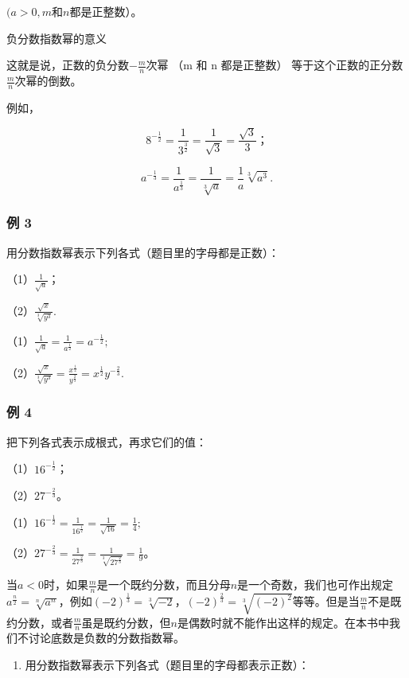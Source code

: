 \((a > 0, m\)和\(n\)都是正整数）。

负分数指数幂的意义

这就是说，正数的负分数\(-\frac{m}{n}\)次幂 （m 和 n 都是正整数）
等于这个正数的正分数\(\frac{m}{n}\)次幂的倒数。

例如，

\[
8 ^ {- \frac{1}{2}} = \frac{1}{3 ^ {\frac{3}{2}}} = \frac{1}{\sqrt {3}} = \frac{\sqrt {3}}{3}\text{；}
\]

\[
a ^ {- \frac{1}{3}} = \frac{1}{a ^ {\frac{1}{3}}} = \frac{1}{\sqrt[3]{a}} = \frac{1}{a} \sqrt[3]{a ^ {3}}.
\]

\subsubsection{例 3}

用分数指数幂表示下列各式（题目里的字母都是正数）：

（1）\(\frac{1}{\sqrt{a}}\)；

（2）\(\frac{\sqrt{x}}{\sqrt[3]{y^3}}.\)

（1）\(\frac{1}{\sqrt{a}} = \frac{1}{a^{\frac{1}{2}}} = a^{-\frac{1}{2}};\)

（2）\(\frac{\sqrt{x}}{\sqrt[3]{y^3}} = \frac{x^{\frac{1}{2}}}{y^{\frac{2}{3}}} = x^{\frac{1}{2}}y^{-\frac{2}{3}}.\)

\subsubsection{例 4}

把下列各式表示成根式，再求它们的值：

（1）\(16^{-\frac{1}{2}}\)；

（2）\(27^{-\frac{2}{3}}\)。

（1）\(16^{-\frac{1}{2}} = \frac{1}{16^{\frac{1}{2}}} = \frac{1}{\sqrt{16}} = \frac{1}{4};\)

（2）\(27^{-\frac{2}{3}} = \frac{1}{27^{\frac{2}{3}}} = \frac{1}{\sqrt[3]{27^{\frac{2}{3}}}} = \frac{1}{9}\)。

当\(a < 0\)时，如果\(\frac{m}{n}\)是一个既约分数，而且分母\(n\)是一个奇数，我们也可作出规定\(a^{\frac{n}{2}} = \sqrt[n]{a^n}\)，例如\((-2)^{\frac{1}{3}} = \sqrt[3]{-2}\)，\((-2)^{\frac{2}{3}} = \sqrt[3]{(-2)^2}\)等等。但是当\(\frac{m}{n}\)不是既约分数，或者\(\frac{m}{n}\)虽是既约分数，但\(n\)是偶数时就不能作出这样的规定。在本书中我们不讨论底数是负数的分数指数幂。

\begin{enumerate}
\item
  用分数指数幂表示下列各式（题目里的字母都表示正数）：
\end{enumerate}

